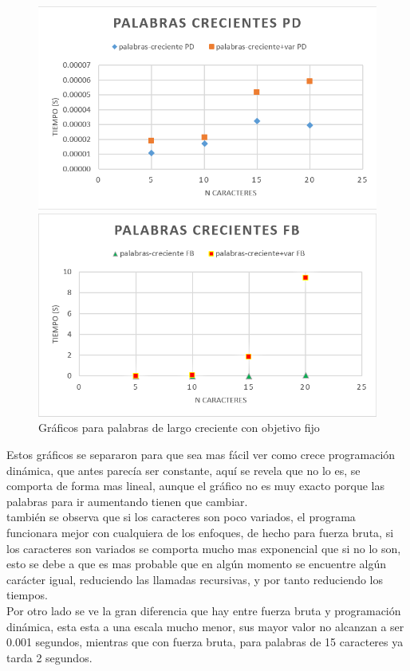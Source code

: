 \begin{figure}[H]
    \centering
    \begin{minipage}[t]{0.5\textwidth}
        \includegraphics[width=\textwidth]{images/palabras-credientes-pd.png}
    \end{minipage}%
    \begin{minipage}[t]{0.5\textwidth}
        \includegraphics[width=\textwidth]{images/palabras-credientes-fb.png}    \end{minipage}%
    \caption{Gráficos para palabras de largo creciente con objetivo fijo}
    \label{fig:Pcreciente}
\end{figure} 

Estos gráficos se separaron para que sea mas fácil ver como crece programación dinámica, que antes parecía ser constante, aquí se revela que no lo es, se comporta de forma mas lineal, aunque el gráfico no es muy exacto porque las palabras para ir aumentando tienen que cambiar.\\
también se observa que si los caracteres son poco variados, el programa funcionara mejor con cualquiera de los enfoques, de hecho para fuerza bruta, si los caracteres son variados se comporta mucho mas exponencial que si no lo son, esto se debe a que es mas probable que en algún momento se encuentre algún carácter igual,  reduciendo las llamadas recursivas, y por tanto reduciendo los tiempos.\\
Por otro lado se ve la gran diferencia que hay entre fuerza bruta y programación dinámica, esta esta a una escala mucho menor, sus mayor valor no alcanzan a ser 0.001 segundos, mientras que con fuerza bruta, para palabras de 15 caracteres ya tarda 2 segundos.\\


